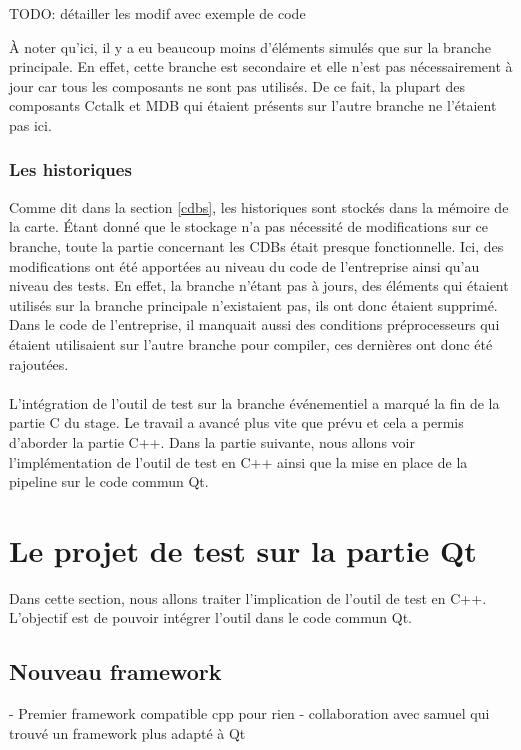 \documentclass[a4paper]{article}
\begin{document}
TODO: détailler les modif avec exemple de code

À noter qu'ici, il y a eu beaucoup moins d'éléments simulés que sur la branche
principale. En effet, cette branche est secondaire et elle n'est pas
nécessairement à jour car tous les composants ne sont pas utilisés. De ce fait,
la plupart des composants Cctalk et MDB qui étaient présents sur l'autre branche
ne l'étaient pas ici.

\subsubsection*{Les historiques}

Comme dit dans la section \ref{cdbs}, les historiques sont stockés dans la
mémoire de la carte. Étant donné que le stockage n'a pas nécessité de
modifications sur ce branche, toute la partie concernant les CDBs était presque
fonctionnelle. Ici, des modifications ont été apportées au niveau du code de
l'entreprise ainsi qu'au niveau des tests. En effet, la branche n'étant pas à
jours, des éléments qui étaient utilisés sur la branche principale n'existaient
pas, ils ont donc étaient supprimé. Dans le code de l'entreprise, il manquait
aussi des conditions préprocesseurs qui étaient utilisaient sur l'autre branche
pour compiler, ces dernières ont donc été rajoutées.
\\~\\

L'intégration de l'outil de test sur la branche événementiel a marqué la fin de
la partie C du stage. Le travail a avancé plus vite que prévu et cela a permis
d'aborder la partie C++. Dans la partie suivante, nous allons voir
l'implémentation de l'outil de test en C++ ainsi que la mise en place de la
pipeline sur le code commun Qt.
\section{Le projet de test sur la partie Qt}%

Dans cette section, nous allons traiter l'implication de l'outil de test en
C++. L'objectif est de pouvoir intégrer l'outil dans le code commun Qt.

\subsection{Nouveau framework}

- Premier framework compatible cpp pour rien
- collaboration avec samuel qui trouvé un framework plus adapté à Qt
\end{document}
